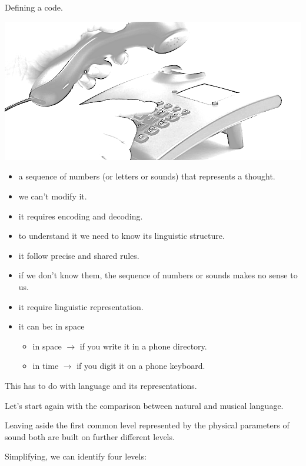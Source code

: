 Defining a code.

\begin{center}
\includegraphics[scale=0.6]{../img/telefono.png}
\end{center}

\begin{itemize}
\tightlist
\item a sequence of numbers (or letters or sounds) that represents a thought.
\item we can't modify it.
\item it requires encoding and decoding.
\item to understand it we need to know its linguistic structure.
\item it follow precise and shared rules.
\item if we don't know them, the sequence of numbers or sounds makes no sense to us.
\item it require linguistic representation.
\item it can be: in space

  \begin{itemize}
  \tightlist
  \item in space \(\rightarrow\) if you write it in a phone directory.
  \item in time \(\rightarrow\) if you digit it on a phone keyboard.
  \end{itemize}
\end{itemize}

This has to do with language and its representations.

Let's start again with the comparison between natural and musical language.

Leaving aside the first common level represented by the physical parameters of sound both are built on further different levels.

Simplifying, we can identify four levels:

